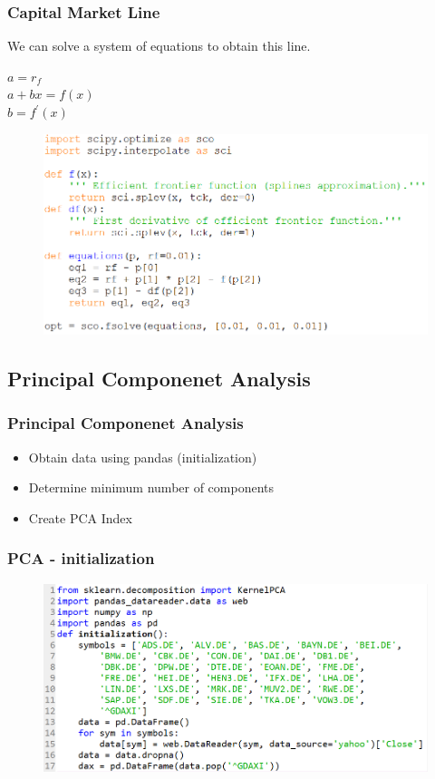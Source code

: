 \documentclass{beamer}
\begin{document}
\begin{frame}
\frametitle{Capital Market Line}
We can solve a system of equations to obtain this line.
\begin{center}
		$ a = r_{f} $\\
		$ a + bx = f(x) $\\
		$ b = f^{\prime}(x) $
\end{center}
\begin{figure}[H]
	\includegraphics[scale=0.44]{generate_CML.png}
\end{figure}
\end{frame}

\subsection{Principal Componenet Analysis}

\begin{frame}
\frametitle{Principal Componenet Analysis}
\begin{itemize}
	\item Obtain data using pandas (initialization)
	\item Determine minimum number of components
	\item Create PCA Index
\end{itemize}
\end{frame}

\begin{frame}
\frametitle{PCA - initialization}
\begin{figure}[H]
	\includegraphics[scale=0.47]{pca_initialization.png}
\end{figure}
\end{frame}
\end{document}
